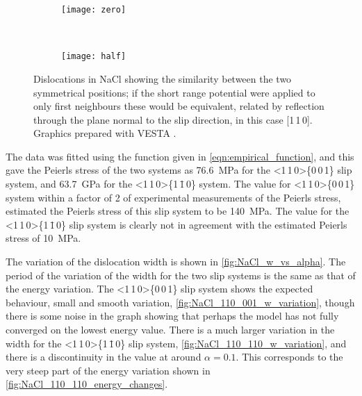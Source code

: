 \begin{figure}
\end{figure}



\begin{figure}
\centering
\begin{subfigure}{55mm}
\centering
\texttt{[image: zero]}
\caption{}
\end{subfigure}
~
\begin{subfigure}{55mm}
\centering
\texttt{[image: half]}
\caption{}
\end{subfigure}


\caption[The symmetrical positions of dislocations in NaCl.]{Dislocations in NaCl showing the similarity between the two symmetrical positions; if the short range potential were applied to only first neighbours these would be equivalent, related by reflection through the plane normal to the slip direction, in this case [1\,1\,0]. Graphics prepared with VESTA \cite{Momma2011}.\label{fig:NaCl_symmetry}}
\end{figure}


The data was fitted using the function given in \autoref{eqn:empirical_function}, and this gave the Peierls stress of the two systems as \SI{76.6}{\mega\pascal} for the <1\,1\,0>\{0\,0\,1\} slip system, and \SI{63.7}{\giga\pascal} for the <1\,1\,0>\{1\,\={1}\,0\} system. The value for <1\,1\,0>\{0\,0\,1\} system within a factor of 2 of experimental measurements of the Peierls stress, \citet{Haasen1985} estimated the Peierls stress of this slip system to be \SI{140}{\mega\pascal}. The value for the <1\,1\,0>\{1\,\={1}\,0\} slip system is clearly not in agreement with the estimated Peierls stress of \SI{10}{\mega\pascal}.



The variation of the dislocation width is shown in \autoref{fig:NaCl_w_vs_alpha}. The period of the variation of the width for the two slip systems is the same as that of the energy variation. The <1\,1\,0>\{0\,0\,1\} slip system shows the expected behaviour, small and smooth variation, \autoref{fig:NaCl_110_001_w_variation}, though there is some noise in the graph showing that perhaps the model has not fully converged on the lowest energy value. There is a much larger variation in the width for the <1\,1\,0>\{1\,\={1}\,0\} slip system, \ref{fig:NaCl_110_110_w_variation}, and there is a discontinuity in the value at around $\alpha=0.1$. This corresponds to the very steep part of the energy variation shown in \autoref{fig:NaCl_110_110_energy_changes}.


